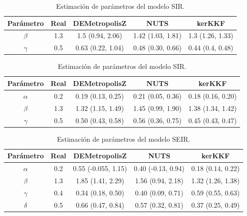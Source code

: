 \begin{table}[h!]
    \centering
    \caption{Estimación de parámetros del modelo SIR.} 
    \begin{tabular}{|c|c|c|c|c|}
    \hline
    \textbf{Parámetro} & \textbf{Real} & \textbf{DEMetropolisZ} & \textbf{NUTS} & \textbf{kerKKF}  \\ \hline
    $\beta$ & 1.3 & 1.5 (0.94, 2.06) & 1.42 (1.03, 1.81) & 1.3 (1.26, 1.33) \\ \hline
    $\gamma$ & 0.5 & 0.63 (0.22, 1.04) & 0.48 (0.30, 0.66) & 0.44 (0.4, 0.48) \\ \hline
    \end{tabular}
    \label{tab:SIR_params}
\end{table}

\begin{table}[h!]
    \centering
    \caption{Estimación de parámetros del modelo SIR.} 
    \begin{tabular}{|c|c|c|c|c|}
    \hline
    \textbf{Parámetro}& \textbf{Real} & \textbf{DEMetropolisZ} & \textbf{NUTS} & \textbf{kerKKF}  \\ \hline
    $\alpha$ & 0.2 & 0.19 (0.13, 0.25) & 0.21 (0.05, 0.36) & 0.18 (0.16, 0.20) \\ \hline
    $\beta$ & 1.3 & 1.32 (1.15, 1.49) & 1.45 (0.99, 1.90) & 1.38 (1.34, 1.42) \\ \hline
    $\gamma$ & 0.5 & 0.50 (0.43, 0.58) & 0.56 (0.36, 0.75) & 0.45 (0.43, 0.47) \\ \hline
    \end{tabular}
    \label{tab:SIR_params}
\end{table}

\begin{table}[h!]
    \centering
    \caption{Estimación de parámetros del modelo SEIR.} 
    \begin{tabular}{|c|c|c|c|c|}
    \hline
    \textbf{Parámetro}& \textbf{Real} & \textbf{DEMetropolisZ} & \textbf{NUTS} & \textbf{kerKKF}  \\ \hline
    $\alpha$ & 0.2 & 0.55 (-0.055, 1.15) & 0.40 (-0.13, 0.94) & 0.18 (0.14, 0.22) \\ \hline
    $\beta$ & 1.3 & 1.85 (1.41, 2.29) & 1.56 (0.94, 2.18) & 1.32 (1.26, 1.38)\\  \hline
    $\gamma$ & 0.4 & 0.34 (0.18, 0.50) & 0.40 (0.09, 0.71) & 0.59 (0.55, 0.63)\\ \hline
    $\delta$ & 0.5 & 0.66 (0.47, 0.84) & 0.57 (0.32, 0.81) & 0.37 (0.25, 0.49)\\ \hline
    \end{tabular}
    \label{tab:SIR_params}
\end{table}

